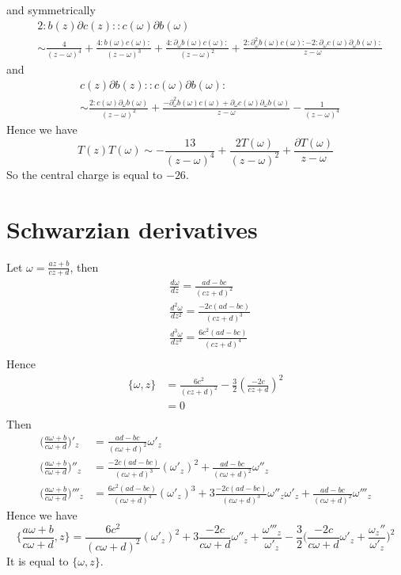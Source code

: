 \documentclass[11pt,a4paper]{article}
\theoremstyle{definition}
\begin{document}
 and symmetrically 
 \[
	\begin{aligned}
	&2: b(z) \partial c(z):: c(\omega) \partial b(\omega)\\
	& \sim \frac{4}{(z-\omega)^4} + \frac{4:b(\omega) c(\omega):}{(z-\omega)^3} + \frac{4 :\partial_\omega b(\omega) c(\omega):}{(z-\omega)^2} + \frac{2: \partial_\omega^2 b(\omega) c(\omega): -2 : \partial_\omega c(\omega) \partial_\omega b(\omega):}{z-\omega} 
	\end{aligned}
 \]
 and
 \[
	\begin{aligned}
	&c(z)\partial b(z) :: c(\omega) \partial b(\omega):\\
	& \sim \frac{2: c(\omega) \partial_{\omega}b(\omega) }{(z-\omega)^2} + \frac{-\partial^2_\omega b(\omega) c(\omega)+\partial_\omega c(\omega)\partial_\omega b(\omega)}{z-\omega} - \frac{1}{(z-\omega)^4}
	\end{aligned}
 \]
 Hence we have 
 \[
 T(z)T(\omega) \sim -\frac{13}{(z-\omega)^4} + \frac{2T(\omega)}{(z-\omega)^2} + \frac{\partial T(\omega)}{z-\omega}
 \]
 So the central charge is equal to $-26$.
\section{Schwarzian derivatives}
Let $\omega = \frac{az+b}{cz +d}$, then
\[
\begin{aligned}
&\frac{d\omega}{d z} = \frac{ad-bc}{(cz+d)^2}\\
&\frac{d^2\omega}{dz^2} = \frac{-2c(ad-bc)}{(cz+d)^3}\\
&\frac{d^3\omega}{dz^3} = \frac{6c^2(ad-bc)}{(cz+d)^4}\\
\end{aligned}
\]
Hence
\[
\begin{aligned}
\{\omega,z\} & = \frac{6c^2}{(cz+d)^2} -\frac{3}{2}(\frac{-2c}{cz+d})^2\\
&=0\\
\end{aligned}
\]
Then
\[
\begin{aligned}
\Big(\frac{a \omega +b}{c \omega +d}\Big)'_z &= \frac{ad-bc}{(c\omega +d)^2} \omega'_z\\
\Big(\frac{a \omega +b}{c \omega +d}\Big)''_z&= \frac{-2c(ad-bc)}{(c\omega+d)^3}(\omega'_z)^2 + \frac{ad-bc}{(c\omega +d)^2} \omega''_z\\
\Big(\frac{a \omega +b}{c \omega +d}\Big)'''_z&= \frac{6c^2(ad-bc)}{(c\omega +d)^4}(\omega'_z)^3 +3 \frac{-2c(ad-bc)}{(c\omega+d)^3} \omega''_z \omega'_z + \frac{ad-bc}{(c\omega +d)^2} \omega'''_z
\end{aligned}
\]
Hence we have
\[
\{ \frac{a \omega +b}{c\omega+d}, z\} = \frac{6c^2}{(c\omega +d)^2}(\omega'_z)^2 + 3 \frac{-2c}{c\omega+d} \omega''_z + \frac{\omega'''_z}{\omega'_z} - \frac{3}{2}\Big(\frac{-2c}{c\omega +d} \omega'_z + \frac{\omega_z''}{\omega'_z}\Big)^2
\]
It is equal to $\{\omega, z\}$.


\end{document}
